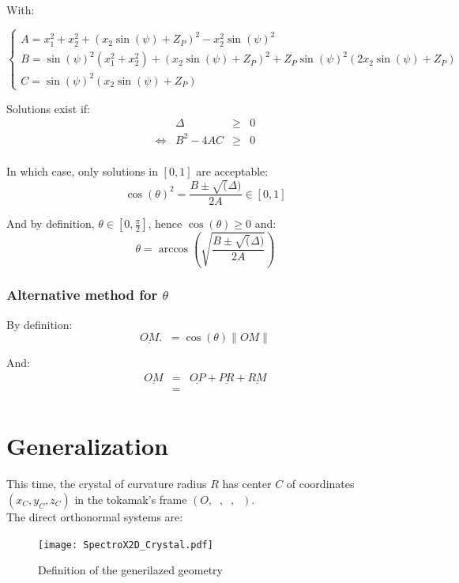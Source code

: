 \documentclass[a4paper,11pt,twoside,titlepage,openright]{book}
\numberwithin{equation}{section}
\newcommand{\lt}{\left}
\newcommand{\rt}{\right}
\DeclareMathOperator{\ex}{\underline{e}_x}
\DeclareMathOperator{\ey}{\underline{e}_y}
\DeclareMathOperator{\ez}{\underline{e}_z}
\begin{document}
With:

$$
\lt\{
	\begin{array}{lll}
		A = x_1^2 + x_2^2 + \lt(x_2\sin(\psi) + Z_P\rt)^2 - x_2^2\sin(\psi)^2\\
		B = \sin(\psi)^2\lt(x_1^2+x_2^2\rt) + \lt(x_2\sin(\psi) + Z_P\rt)^2 + Z_P\sin(\psi)^2\lt(2x_2\sin(\psi) + Z_P\rt)\\
		C = \sin(\psi)^2\lt(x_2\sin(\psi) + Z_P\rt)
	\end{array}
\rt.
$$

Solutions exist if:
$$
\begin{array}{lllll}
    & \Delta & \geq & 0\\
    \Leftrightarrow
    & B^2 - 4AC & \geq & 0\\
\end{array}
$$

In which case, only solutions in $\lt[0,1\rt]$ are acceptable:
$$
\cos(\theta)^2 = \frac{B \pm \sqrt(\Delta)}{2A} \in \lt[0,1\rt]
$$

And by definition, $\theta \in \lt[0,\frac{\pi}{2}\rt]$, hence $\cos(\theta)\geq0$ and:
$$
\theta = \arccos\lt(\sqrt{\frac{B \pm \sqrt(\Delta)}{2A}}\rt)
$$

\subsubsection{Alternative method for $\theta$}

By definition:
$$
\underline{OM}.\ez = \cos(\theta)\|OM\|
$$

And:
$$
\begin{array}{lllll}
	\underline{OM} 	& = & \underline{OP} + \underline{PR} + \underline{RM}\\
			& = & \\
\end{array}
$$

\newpage
\section{Generalization}

This time, the crystal of curvature radius $R$ has center $C$ of coordinates $(x_C, y_C, z_C)$ in the tokamak's frame $(O, \ex, \ey, \ez)$.\\
The direct orthonormal systems are:

\begin{figure}[hbt]
	\texttt{[image: SpectroX2D\_Crystal.pdf]}
	\caption{Definition of the generilazed geometry}
	\label{fig:sketch}
\end{figure}
\end{document}
